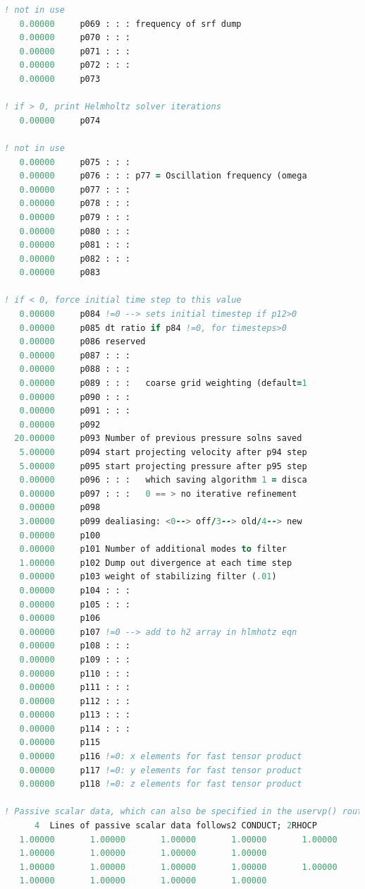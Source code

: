 \documentclass[10pt]{article}
\numberwithin{equation}{section} %
\begin{document}
\begin{itemize}
\begin{lstlisting}[language=Fortran]
! not in use
   0.00000     p069 : : : frequency of srf dump
   0.00000     p070 : : :
   0.00000     p071 : : :
   0.00000     p072 : : :
   0.00000     p073

! if > 0, print Helmholtz solver iterations
   0.00000     p074

! not in use
   0.00000     p075 : : :
   0.00000     p076 : : : p77 = Oscillation frequency (omega
   0.00000     p077 : : :
   0.00000     p078 : : :
   0.00000     p079 : : :
   0.00000     p080 : : :
   0.00000     p081 : : :
   0.00000     p082 : : :
   0.00000     p083

! if < 0, force initial time step to this value
   0.00000     p084 !=0 --> sets initial timestep if p12>0
   0.00000     p085 dt ratio if p84 !=0, for timesteps>0
   0.00000     p086 reserved
   0.00000     p087 : : :
   0.00000     p088 : : :
   0.00000     p089 : : :   coarse grid weighting (default=1
   0.00000     p090 : : :
   0.00000     p091 : : :
   0.00000     p092
  20.00000     p093 Number of previous pressure solns saved
   5.00000     p094 start projecting velocity after p94 step
   5.00000     p095 start projecting pressure after p95 step
   0.00000     p096 : : :   which saving algorithm 1 = disca
   0.00000     p097 : : :   0 == > no iterative refinement
   0.00000     p098
   3.00000     p099 dealiasing: <0--> off/3--> old/4--> new
   0.00000     p100
   0.00000     p101 Number of additional modes to filter
   1.00000     p102 Dump out divergence at each time step
   0.00000     p103 weight of stabilizing filter (.01)
   0.00000     p104 : : :
   0.00000     p105 : : :
   0.00000     p106
   0.00000     p107 !=0 --> add to h2 array in hlmhotz eqn
   0.00000     p108 : : :
   0.00000     p109 : : :
   0.00000     p110 : : :
   0.00000     p111 : : :
   0.00000     p112 : : :
   0.00000     p113 : : :
   0.00000     p114 : : :
   0.00000     p115
   0.00000     p116 !=0: x elements for fast tensor product
   0.00000     p117 !=0: y elements for fast tensor product
   0.00000     p118 !=0: z elements for fast tensor product

! Passive scalar data, which can also be specified in the uservp() routine in the user file, can also be specified in this file. These lines list the values of conductivity in ascending order, followed by the heat capacity coefficients. A total of 9 passive scalars can be transported.
      4  Lines of passive scalar data follows2 CONDUCT; 2RHOCP
   1.00000       1.00000       1.00000       1.00000       1.00000
   1.00000       1.00000       1.00000       1.00000
   1.00000       1.00000       1.00000       1.00000       1.00000
   1.00000       1.00000       1.00000       1.00000


\end{lstlisting}
\end{itemize}
\end{document}
